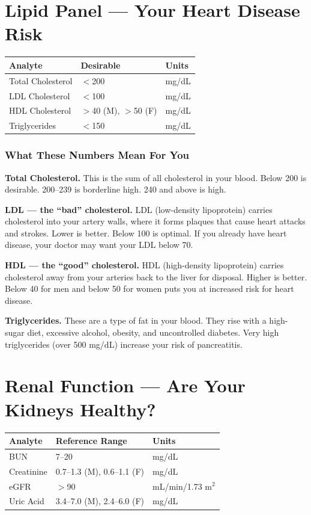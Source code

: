 \clearpage
\section{Lipid Panel --- Your Heart Disease Risk}

\begin{longtable}{@{}lll@{}}
\toprule
\textbf{Analyte} & \textbf{Desirable} & \textbf{Units} \\
\midrule
Total Cholesterol & $<$200 & mg/dL \\
LDL Cholesterol & $<$100 & mg/dL \\
HDL Cholesterol & $>$40 (M), $>$50 (F) & mg/dL \\
Triglycerides & $<$150 & mg/dL \\
\bottomrule
\end{longtable}

\subsubsection{What These Numbers Mean For You}

\textbf{Total Cholesterol.} This is the sum of all cholesterol in your blood. Below 200 is desirable. 200--239 is borderline high. 240 and above is high.

\textbf{LDL --- the ``bad'' cholesterol.} LDL (low-density lipoprotein) carries cholesterol into your artery walls, where it forms plaques that cause heart attacks and strokes. Lower is better. Below 100 is optimal. If you already have heart disease, your doctor may want your LDL below 70.

\textbf{HDL --- the ``good'' cholesterol.} HDL (high-density lipoprotein) carries cholesterol away from your arteries back to the liver for disposal. Higher is better. Below 40 for men and below 50 for women puts you at increased risk for heart disease.

\textbf{Triglycerides.} These are a type of fat in your blood. They rise with a high-sugar diet, excessive alcohol, obesity, and uncontrolled diabetes. Very high triglycerides (over 500 mg/dL) increase your risk of pancreatitis.

\clearpage
\section{Renal Function --- Are Your Kidneys Healthy?}

\begin{longtable}{@{}lll@{}}
\toprule
\textbf{Analyte} & \textbf{Reference Range} & \textbf{Units} \\
\midrule
BUN & 7--20 & mg/dL \\
Creatinine & 0.7--1.3 (M), 0.6--1.1 (F) & mg/dL \\
eGFR & $>$90 & mL/min/1.73 m$^2$ \\
Uric Acid & 3.4--7.0 (M), 2.4--6.0 (F) & mg/dL \\
\bottomrule
\end{longtable}


